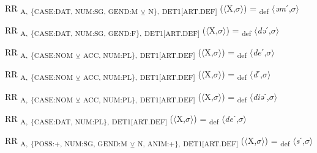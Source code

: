 {\begin{exe}
 RR \textsubscript{A,} \textsubscript{\{CASE:DAT, NUM:SG, GEND:M} \textsubscript{${\veebar}$}\textsubscript{ N\},} \textsubscript{DET1[ART.DEF]} ($\langle$X,$\sigma $$\rangle$) = \textsubscript{def} $\langle$\textit{əm}ˊ,$\sigma $$\rangle$
\end{exe}

\begin{exe}
 RR \textsubscript{A,} \textsubscript{\{CASE:DAT, NUM:SG, GEND:F\},} \textsubscript{DET1[ART.DEF]} ($\langle$X,$\sigma $$\rangle$) = \textsubscript{def} $\langle$\textit{də}ˊ,$\sigma $$\rangle$
\end{exe}

\begin{exe}
 RR \textsubscript{A,} \textsubscript{\{CASE:NOM} \textsubscript{${\veebar}$}\textsubscript{ ACC, NUM:PL\},} \textsubscript{DET1[ART.DEF]} ($\langle$X,$\sigma $$\rangle$) = \textsubscript{def} $\langle$\textit{de}ˊ,$\sigma $$\rangle$
\end{exe}

\begin{exe}
 RR \textsubscript{A,} \textsubscript{\{CASE:NOM} \textsubscript{${\veebar}$}\textsubscript{ ACC, NUM:PL\},} \textsubscript{DET1[ART.DEF]} ($\langle$X,$\sigma $$\rangle$) = \textsubscript{def} $\langle$\textit{d}ˊ,$\sigma $$\rangle$
\end{exe}

\begin{exe}
 RR \textsubscript{A,} \textsubscript{\{CASE:NOM} \textsubscript{${\veebar}$}\textsubscript{ ACC, NUM:PL\},} \textsubscript{DET1[ART.DEF]} ($\langle$X,$\sigma $$\rangle$) = \textsubscript{def} $\langle$\textit{diə}ˊ,$\sigma $$\rangle$
\end{exe}

\begin{exe}
 RR \textsubscript{A,} \textsubscript{\{CASE:DAT, NUM:PL\},} \textsubscript{DET1[ART.DEF]} ($\langle$X,$\sigma $$\rangle$) = \textsubscript{def} $\langle$\textit{de}ˊ,$\sigma $$\rangle$
\end{exe}

\begin{exe}
 RR \textsubscript{A,} \textsubscript{\{POSS:+, NUM:SG, GEND:M} \textsubscript{${\veebar}$}\textsubscript{ N, ANIM:+\},} \textsubscript{DET1[ART.DEF]} ($\langle$X,$\sigma $$\rangle$) = \textsubscript{def} $\langle$\textit{s}ˊ,$\sigma $$\rangle$
\end{exe}

}
